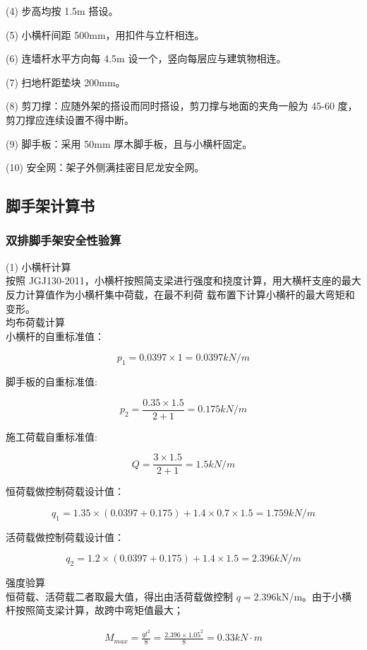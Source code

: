 (4) 步高均按 1.5m 搭设。

(5) 小横杆间距 500mm，用扣件与立杆相连。

(6) 连墙杆水平方向每 4.5m 设一个，竖向每层应与建筑物相连。

(7) 扫地杆距垫块 200mm。

(8) 剪刀撑：应随外架的搭设而同时搭设，剪刀撑与地面的夹角一般为 45-60 度，
剪刀撑应连续设置不得中断。

(9) 脚手板：采用 50mm 厚木脚手板，且与小横杆固定。

(10) 安全网：架子外侧满挂密目尼龙安全网。

\subsection{脚手架计算书}
\subsubsection{双排脚手架安全性验算}

(1) 小横杆计算\\

按照 JGJ130-2011，小横杆按照简支梁进行强度和挠度计算，用大横杆支座的最大反力计算值作为小横杆集中荷载，在最不利荷
载布置下计算小横杆的最大弯矩和变形。\\

 均布荷载计算\\

小横杆的自重标准值：

$$p_1=0.0397 \times 1=0.0397 kN/m$$

脚手板的自重标准值:

$$p_2=\frac{0.35 \times 1.5}{2+1}=0.175 kN/m$$

施工荷载自重标准值:

$$Q=\frac{3 \times 1.5}{2+1}=1.5 kN/m$$

恒荷载做控制荷载设计值：

$$q_1=1.35\times(0.0397+0.175)+1.4\times 0.7\times 1.5=1.759 kN/m$$

活荷载做控制荷载设计值：

$$q_2=1.2\times(0.0397+0.175)+1.4\times 1.5=2.396 kN/m$$

 强度验算\\

恒荷载、活荷载二者取最大值，得出由活荷载做控制 $q=2.396 $kN/m。由于小横杆按照简支梁计算，故跨中弯矩值最大；

\begin{align}
    M_{max}=\frac{ql^2}{8}=\frac{2.396\times 1.05^2}{8}=0.33 kN\cdot m
\end{align}

